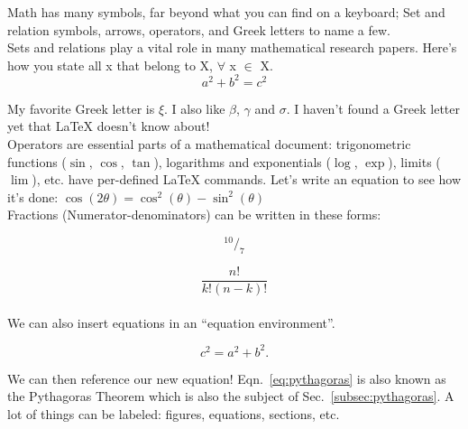 \documentclass[12pt]{article}
\begin{document}
Math has many symbols, far beyond what you can find on a keyboard;
Set and relation symbols, arrows, operators, and Greek letters to name a few.\\

Sets and relations play a vital role in many mathematical research papers.
Here's how you state all x that belong to X, $\forall$ x $\in$ X. \\

\[a^2 + b^2 = c^2 \]

My favorite Greek letter is $\xi$. I also like $\beta$, $\gamma$ and $\sigma$.
I haven't found a Greek letter yet that \LaTeX \hspace{1pt} doesn't know
about! \\

Operators are essential parts of a mathematical document: 
trigonometric functions ($\sin$, $\cos$, $\tan$), 
logarithms and exponentials ($\log$, $\exp$), 
limits ($\lim$), etc. 
have per-defined LaTeX commands. 
Let's write an equation to see how it's done: 
$\cos(2\theta) = \cos^{2}(\theta) - \sin^{2}(\theta)$ \\

Fractions (Numerator-denominators) can be written in these forms:

$$ ^{10}/_{7} $$

$$ \frac{n!}{k!(n - k)!} $$ \\

We can also insert equations in an ``equation environment''.

\begin{equation} %
    c^2 = a^2 + b^2.
    \label{eq:pythagoras} %
\end{equation} %

We can then reference our new equation! 
Eqn.~\ref{eq:pythagoras} is also known as the Pythagoras Theorem which is also
the subject of Sec.~\ref{subsec:pythagoras}. A lot of things can be labeled: 
figures, equations, sections, etc.
\end{document}

